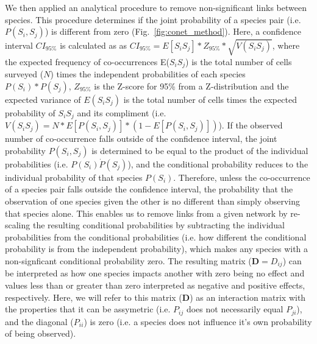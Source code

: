 \documentclass[9pt,twocolumn,twoside,lineno]{pnas-new}
\begin{document}
{We then applied an analytical procedure to remove non-significant
links between species. This procedure determines if the joint
probability of a species pair (i.e. $P(S_i,S_j)$) is different from
zero (Fig.~\ref{fig:conet_method}).  Here, a confidence interval
$CI_{95\%}$ is calculated as as $CI_{95\%} = E[S_iS_j] * Z_{95\%} *
\sqrt{V(S_iS_j)}$, where the expected frequency of co-occurrences
E($S_iS_j$) is the total number of cells surveyed ($N$) times the
independent probabilities of each species $P(S_i) * P(S_j)$,
$Z_{95\%}$ is the Z-score for 95\% from a Z-distribution and the
expected variance of $E(S_iS_j)$ is the total number of cells times
the expected probability of $S_iS_j$ and its compliment
(i.e. $V(S_iS_j) = N * E[P(S_i,S_j)] * (1 - E[P(S_i,S_j)])$). If the
observed number of co-occurrence falls outside of the confidence
interval, the joint probability $P(S_i,S_j)$ is determined to be equal
to the product of the individual probabilities (i.e. $P(S_i) \dot
P(S_j)$), and the conditional probability reduces to the individual
probability of that species $P(S_i)$. Therefore, unless the
co-occurrence of a species pair falls outside the confidence interval,
the probability that the observation of one species given the other is
no different than simply observing that species alone. This enables us
to remove links from a given network by re-scaling the resulting
conditional probabilities by subtracting the individual probabilities
from the conditional probabilities (i.e. how different the conditional
probability is from the independent probability), which makes any
species with a non-signficant conditional probability zero. The
resulting matrix ($\mathbf{D} = D_{ij}$) can be interpreted as how one
species impacts another with zero being no effect and values less than
or greater than zero interpreted as negative and positive effects,
respectively. Here, we will refer to this matrix ($\mathbf{D}$) as an
interaction matrix with the properties that it can be assymetric
(i.e. $P_{ij}$ does not necessarily equal $P_{ji}$), and the diagonal
($P_{ii}$) is zero (i.e. a species does not influence it's own
probability of being observed).

}
\end{document}
